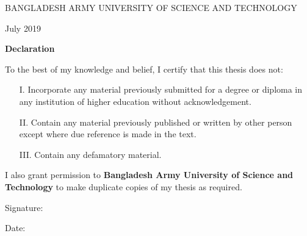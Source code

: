 \documentclass[12pt,a4paper]{article}
\newcommand\fillin[1][3cm]{\makebox[#1]{\dotfill}}
\renewcommand{\baselinestretch}{1}
\begin{document}
\begin{titlepage}
\begin{comment}
	\fontsize{16}{10}\fontfamily{ptm}\selectfont{\begin{flushleft}
	Supervisor
	\end{flushleft}} & \fontsize{16}{10}\fontfamily{ptm}\selectfont{\begin{flushleft}
	LIANG Zhao
	\end{flushleft}}&\\[0.1pt]
	
	\end{tabular}
	\end{table}	
	\vspace*{\fill}
	\newpage
	\end{comment}
	
	\begin{center}
	
	{\fontsize{15}{10}\selectfont \begin{center}
	\vspace*{\fill}
	\MakeUppercase{Bangladesh Army University of Science and Technology}
	\end{center} \par}
	\vspace{0.5cm}

	{\fontsize{16}{5}\selectfont \begin{center}
	July 2019
	\end{center}\par}
	\vspace{0.3cm}
	{\fontsize{16}{5}\selectfont \begin{center}
	\textbf{Declaration}
	\end{center}\par}
	\vspace{0.5cm} 
	\renewcommand{\baselinestretch}{1.5}
\RaggedRight \fontsize{14}{15}\selectfont To the best of my knowledge and belief, I certify that this thesis does not:\\
\begin{itemize}
	\item[I.] Incorporate any material previously submitted for a degree or diploma in any institution of higher education without acknowledgement.
	\item[II.] Contain any material previously published or written by other person except where due reference is made in the text.
	\item[III.] Contain any defamatory material.
\end{itemize}
I also grant permission to \textbf{Bangladesh Army University of Science and Technology} to make duplicate copies of my thesis as required.	\\
\thispagestyle{empty}
\vspace*{3cm}	
\begin{flushleft}
Signature:\fillin[4.35cm]
\end{flushleft}
Date:\fillin[5.3cm]
	\end{center}
\vspace*{\fill}	
\end{titlepage}	
\end{document}
